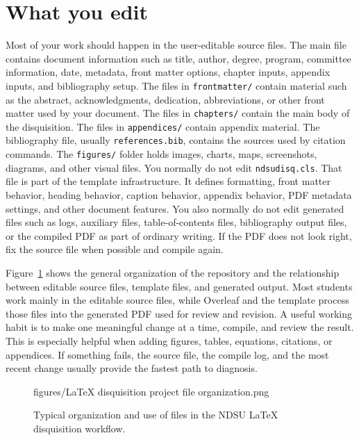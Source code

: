 \section{What you edit}
\label{sec:what-you-edit}

Most of your work should happen in the user-editable source files. The main file contains document information such as title, author, degree, program, committee information, date, metadata, front matter options, chapter inputs, appendix inputs, and bibliography setup. The files in \texttt{frontmatter/} contain material such as the abstract, acknowledgments, dedication, abbreviations, or other front matter used by your document. The files in \texttt{chapters/} contain the main body of the disquisition. The files in \texttt{appendices/} contain appendix material. The bibliography file, usually \texttt{references.bib}, contains the sources used by citation commands. The \texttt{figures/} folder holds images, charts, maps, screenshots, diagrams, and other visual files. You normally do not edit \texttt{ndsudisq.cls}. That file is part of the template infrastructure. It defines formatting, front matter behavior, heading behavior, caption behavior, appendix behavior, PDF metadata settings, and other document features. You also normally do not edit generated files such as logs, auxiliary files, table-of-contents files, bibliography output files, or the compiled PDF as part of ordinary writing. If the PDF does not look right, fix the source file when possible and compile again.


Figure~\ref{fig:project-file-organization} shows the general organization of the repository and the relationship between editable source files, template files, and generated output. Most students work mainly in the editable source files, while Overleaf and the template process those files into the generated PDF used for review and revision. A useful working habit is to make one meaningful change at a time, compile, and review the result. This is especially helpful when adding figures, tables, equations, citations, or appendices. If something fails, the source file, the compile log, and the most recent change usually provide the fastest path to diagnosis.

\begin{figure}[htbp]
\centering
{}
{figures/LaTeX disquisition project file organization.png}

\caption{Typical organization and use of files in the NDSU \LaTeX{} disquisition workflow.}
\label{fig:project-file-organization}


\end{figure}





